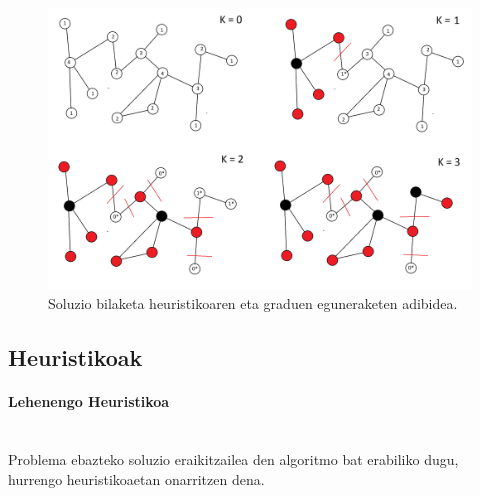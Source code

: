 \documentclass[eu,gi]{ifirak}\usepackage[]{graphicx}\usepackage[]{color}
\begin{document}
\vspace*{0.5cm}


\begin{figure}[htbp]
    \includegraphics[scale=0.2]{Prueba0.png}
    \caption{Soluzio bilaketa heuristikoaren eta graduen eguneraketen adibidea.}
    \label{fig:adibideHeur}
\end{figure}

\subsection{Heuristikoak}
\paragraph{Lehenengo Heuristikoa}\\
Problema ebazteko soluzio eraikitzailea den algoritmo bat erabiliko dugu, hurrengo heuristikoaetan onarritzen dena.
\end{document}
